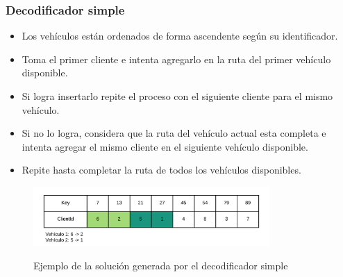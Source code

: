 \documentclass{beamer}
\begin{document}
\begin{frame}
\frametitle{Decodificador simple}

\begin{itemize}
    \item Los vehículos están ordenados de forma ascendente según su identificador.
    \pause
    \item Toma el primer cliente e intenta agregarlo en la ruta del primer vehículo disponible.
    \pause
    \item Si logra insertarlo repite el proceso con el siguiente cliente para el mismo vehículo.
    \pause
    \item Si no lo logra, considera que la ruta del vehículo actual esta completa e intenta agregar el mismo cliente en el siguiente vehículo disponible.
    \pause
    \item Repite hasta completar la ruta de todos los vehículos disponibles.
    \pause
\end{itemize}

\begin{figure}[h]
	\caption{Ejemplo de la solución generada por el decodificador simple}
	\centering
	\includegraphics[width=9cm]{DistribucionClientesDecoSimple}
	\label{fig:DistribucionClientesDecoSimple}
\end{figure}

\end{frame}

\end{document}
